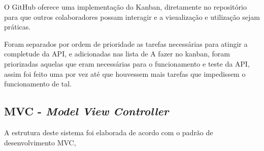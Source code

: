 O GitHub oferece uma implementação do Kanban, diretamente no repositório para que outros colaboradores possam interagir e a visualização e utilização sejam práticas.

Foram separados por ordem de prioridade as tarefas necessárias para atingir a completude da API, e adicionadas nas lista de A fazer no kanban, foram priorizadas aquelas que eram necessárias para o funcionamento e teste da API, assim foi feito uma por vez até que houvessem mais tarefas que impedissem o funcionamento de tal.

\subsection{MVC - \textit{Model View Controller}}

A estrutura deste sistema foi elaborada de acordo com o padrão de desenvolvimento MVC,